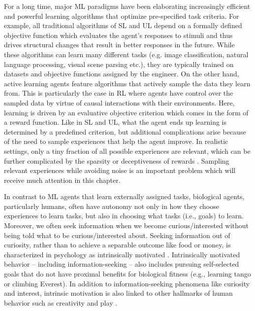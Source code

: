 For a long time, major \ac{ML} paradigms have been elaborating increasingly efficient and powerful learning algorithms that optimize pre-specified task criteria. For example, all traditional algorithms of \ac{SL} and \ac{UL} depend on a formally defined objective function which evaluates the agent’s responses to stimuli and thus drives structural changes that result in better responses in the future. While these algorithms can learn many different tasks (e.g. image classification, natural language processing, visual scene parsing etc.), they are typically trained on datasets and objective functions assigned by the engineer. On the other hand, active learning agents \cite{thrun_lifelong_1994,cohn_active_1995} feature algorithms that actively sample the data they learn from. This is particularly the case in \acf{RL} \cite{sutton2018reinforcement} where agents have control over the sampled data by virtue of causal interactions with their environments. Here, learning is driven by an evaluative objective criterion which comes in the form of a reward function. Like in \ac{SL} and \ac{UL}, what the agent ends up learning is determined by a predefined criterion, but additional complications arise because of the need to sample experiences that help the agent improve. In realistic settings, only a tiny fraction of all possible experiences are relevant, which can be further complicated by the sparsity or deceptiveness of rewards \cite[see ][]{oudeyer_computational_2018}. Sampling relevant experiences while avoiding noise is an important problem which will receive much attention in this chapter.

In contrast to \ac{ML} agents that learn externally assigned tasks, biological agents, particularly humans, often have autonomy not only in how they choose experiences to learn tasks, but also in choosing what tasks (i.e., goals) to learn. Moreover, we often seek information when we become curious/interested without being told what to be curious/interested about. Seeking information out of curiosity, rather than to achieve a separable outcome like food or money, is characterized in psychology as intrinsically motivated \cite{harlow_learning_1950,ryan_self-determination_2000}. Intrinsically motivated behavior -- including information-seeking -- also includes pursuing self-selected goals that do not have proximal benefits for biological fitness (e.g., learning tango or climbing Everest). In addition to information-seeking phenomena like curiosity and interest, intrinsic motivation is also linked to other hallmarks of human behavior such as creativity \cite{gross_cultivating_2020} and play \cite{chu_play_2020}.

